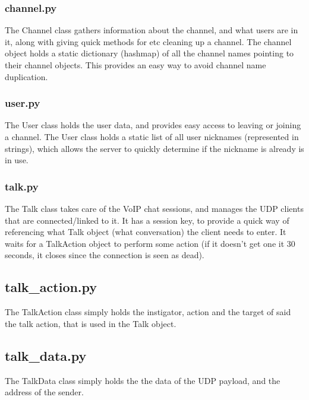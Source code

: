 \documentclass[12pt]{rapport}
\begin{document}
\subsubsection*{channel.py}
The Channel class gathers information about the channel, and what
users are in it, along with giving quick methods for etc cleaning up a
channel. The channel object holds a static dictionary (hashmap) of all
the channel names pointing to their channel objects. This provides an
easy way to avoid channel name duplication.

\subsubsection*{user.py}
The User class holds the user data, and provides easy access to
leaving or joining a channel. The User class holds a static list of
all user nicknames (represented in strings), which allows the server
to quickly determine if the nickname is already is in use.

\subsubsection*{talk.py}
The Talk class takes care of the VoIP chat sessions, and manages the
UDP clients that are connected/linked to it. It has a session key, to
provide a quick way of referencing what Talk object (what
conversation) the client needs to enter. It waits for a TalkAction
object to perform some action (if it doesn't get one it 30 seconds, it
closes since the connection is seen as dead).

\subsection*{talk\_action.py}
The TalkAction class simply holds the instigator, action and the target 
of said the talk action, that is used in the Talk object.

\subsection*{talk\_data.py}
The TalkData class simply holds the the data of the UDP payload, and 
the address of the sender.
\end{document}
